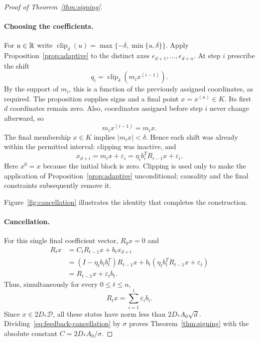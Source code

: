 \begin{proof}[Proof of Theorem~\ref{thm:signing}]
\paragraph{Choosing the coefficients.}
For $u\in\mathbb R$ write
$\operatorname{clip}_\delta(u)=\max\{-\delta,\min\{u,\delta\}\}$.
Apply Proposition~\ref{prop:adaptive} to the distinct axes
$e_{d+1},\ldots,e_{d+n}$.  At step $i$ prescribe the shift
\[
 q_i=\operatorname{clip}_\delta(m_ix^{(i-1)}).
\]
By the support of $m_i$, this is a function of the previously assigned
coordinates, as required.  The proposition supplies signs and a final point
$x=x^{(n)}\in K$.  Its first $d$ coordinates remain zero.  Also, coordinates
assigned before step $i$ never change afterward, so
\[
 m_ix^{(i-1)}=m_ix.
\]
The final membership $x\in K$ implies $|m_ix|<\delta$.  Hence each shift
was already within the permitted interval: clipping was inactive, and
\begin{equation}\label{eq:unclipped-coordinates}
 x_{d+i}=m_ix+\varepsilon_i
 =\eta_i b_i^TR_{i-1}x+\varepsilon_i.
\end{equation}
Here $x^0=x$ because the initial block is zero.  Clipping is used only to
make the application of Proposition~\ref{prop:adaptive} unconditional;
causality and the final constraints subsequently remove it.

Figure~\ref{fig:cancellation} illustrates the identity that completes the
construction.

\paragraph{Cancellation.}
For this single final coefficient vector, $R_0x=0$ and
\begin{align*}
 R_tx
 &=C_tR_{t-1}x+b_tx_{d+t}\\
 &=(I-\eta_tb_tb_t^T)R_{t-1}x
   +b_t(\eta_tb_t^TR_{t-1}x+\varepsilon_t)\\
 &=R_{t-1}x+\varepsilon_tb_t.
\end{align*}
Thus, simultaneously for every $0\le t\le n$,
\begin{equation}\label{eq:feedback-cancellation}
 R_tx=\sum_{i=1}^t\varepsilon_ib_i.
\end{equation}
Since $x\in2D_*\mathcal D$, all these states have norm less than
$2D_*A_0\sqrt d$.  Dividing~\eqref{eq:feedback-cancellation} by $\sigma$
proves Theorem~\ref{thm:signing} with the absolute constant
$C=2D_*A_0/\sigma$.
\end{proof}

